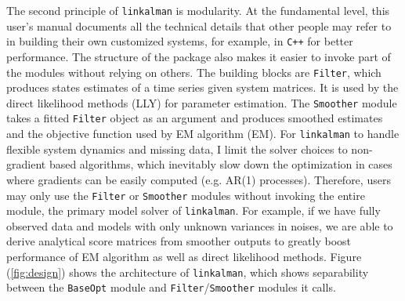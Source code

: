 \documentclass[10pt, titlepage]{article}
\numberwithin{equation}{section}
\begin{document}
The second principle of \texttt{linkalman} is modularity. At the fundamental level, this user's manual documents all the technical details that other people may refer to in building their own customized systems, for example, in \texttt{C++} for better performance. The structure of the package also makes it easier to invoke part of the modules without relying on others. The building blocks are \texttt{Filter}, which produces states estimates of a time series given system matrices. It is used by the direct likelihood methods (LLY) for parameter estimation. The \texttt{Smoother} module takes a fitted \texttt{Filter} object as an argument and produces smoothed estimates and the objective function used by EM algorithm (EM). For \texttt{linkalman} to handle flexible system dynamics and missing data, I limit the solver choices to non-gradient based algorithms, which inevitably slow down the optimization in cases where gradients can be easily computed (e.g. AR(1) processes). Therefore, users may only use the \texttt{Filter} or \texttt{Smoother} modules without invoking the entire  module, the primary model solver of \texttt{linkalman}. For example, if we have fully observed data and models with only unknown variances in noises, we are able to derive analytical score matrices from smoother outputs to greatly boost performance of EM algorithm as well as direct likelihood methods. Figure (\ref{fig:design}) shows the architecture of \texttt{linkalman}, which shows separability between the \texttt{BaseOpt} module and \texttt{Filter}/\texttt{Smoother} modules it calls. 
\end{document}
